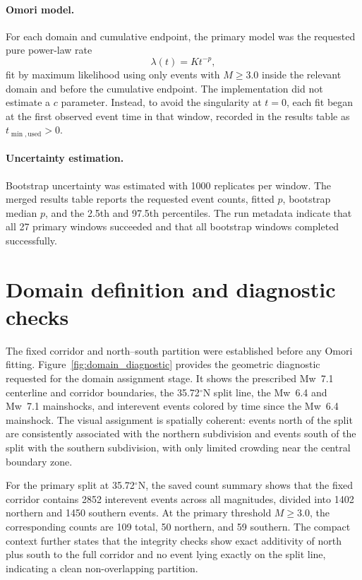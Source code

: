 \documentclass[11pt]{article}
\begin{document}
\paragraph{Omori model.}
For each domain and cumulative endpoint, the primary model was the requested pure power-law rate
\begin{equation}
\lambda(t)=K t^{-p},
\end{equation}
fit by maximum likelihood using only events with $M \geq 3.0$ inside the relevant domain and before the cumulative endpoint. The implementation did not estimate a $c$ parameter. Instead, to avoid the singularity at $t=0$, each fit began at the first observed event time in that window, recorded in the results table as $t_{\min,\mathrm{used}} > 0$.

\paragraph{Uncertainty estimation.}
Bootstrap uncertainty was estimated with 1000 replicates per window. The merged results table reports the requested event counts, fitted $p$, bootstrap median $p$, and the 2.5th and 97.5th percentiles. The run metadata indicate that all 27 primary windows succeeded and that all bootstrap windows completed successfully.

\section{Domain definition and diagnostic checks}
The fixed corridor and north--south partition were established before any Omori fitting. Figure~\ref{fig:domain_diagnostic} provides the geometric diagnostic requested for the domain assignment stage. It shows the prescribed Mw~7.1 centerline and corridor boundaries, the 35.72$^{\circ}$N split line, the Mw~6.4 and Mw~7.1 mainshocks, and interevent events colored by time since the Mw~6.4 mainshock. The visual assignment is spatially coherent: events north of the split are consistently associated with the northern subdivision and events south of the split with the southern subdivision, with only limited crowding near the central boundary zone.

For the primary split at 35.72$^{\circ}$N, the saved count summary shows that the fixed corridor contains 2852 interevent events across all magnitudes, divided into 1402 northern and 1450 southern events. At the primary threshold $M \geq 3.0$, the corresponding counts are 109 total, 50 northern, and 59 southern. The compact context further states that the integrity checks show exact additivity of north plus south to the full corridor and no event lying exactly on the split line, indicating a clean non-overlapping partition.
\end{document}
